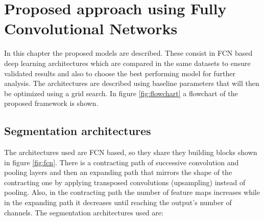 \chapter{Proposed approach using Fully Convolutional Networks}\label{chap:proposed_model}

In this chapter the proposed models are described. These consist in FCN based deep learning architectures which are compared in the same datasets to ensure validated results and also to choose the best performing model for further analysis. The architectures are described using baseline parameters that will then be optimized using a grid search. In figure \ref{fig:flowchart} a flowchart of the proposed framework is shown.

\section{Segmentation architectures}
The architectures used are FCN based, so they share they building blocks shown in figure \ref{fig:fcn}. There is a contracting path of successive convolution and pooling layers and then an expanding path that mirrors the shape of the contracting one by applying transposed convolutions (upsampling) instead of pooling. Also, in the contracting path the number of feature maps increases while in the expanding path it decreases until reaching the output's number of channels. The segmentation architectures used are:

